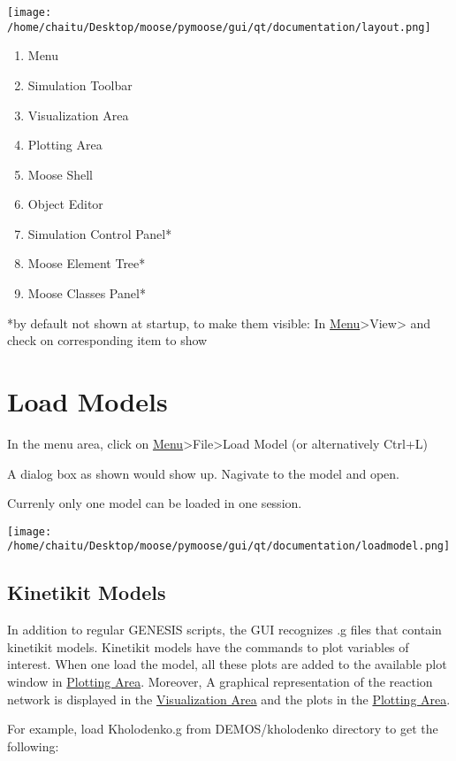 \documentclass[11pt]{article}
\begin{document}
  \texttt{[image: /home/chaitu/Desktop/moose/pymoose/gui/qt/documentation/layout.png]}
  
\begin{enumerate}
\item Menu
\item Simulation Toolbar
\item Visualization Area
\item Plotting Area
\item Moose Shell
\item Object Editor
\item Simulation Control Panel*
\item Moose Element Tree*
\item Moose Classes Panel*
\end{enumerate}
  
  *by default not shown at startup, to make them visible: In \hyperref[sec-2]{Menu}>View> and check on corresponding item to show  


\section{Load Models}
\label{sec-3}


  In the menu area, click on \hyperref[sec-2]{Menu}>File>Load Model (or alternatively Ctrl+L)

  A dialog box as shown would show up. Nagivate to the model and open.

  Currenly only one model can be loaded in one session.
  
  \texttt{[image: /home/chaitu/Desktop/moose/pymoose/gui/qt/documentation/loadmodel.png]}

\subsection{Kinetikit Models}
\label{sec-3.1}

   In addition to regular GENESIS scripts, the GUI recognizes .g files that contain kinetikit models. Kinetikit models have the commands to plot variables of interest. When one load the model, all these plots are added to the available plot window in \hyperref[sec-2]{Plotting Area}. Moreover,  A graphical representation of the reaction network is displayed in the \hyperref[sec-2]{Visualization Area} and the plots in the \hyperref[sec-2]{Plotting Area}. 
   
   For example, load Kholodenko.g from DEMOS/kholodenko directory to get the following:
\end{document}
